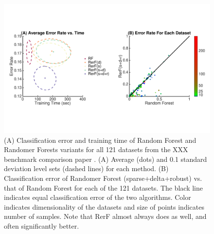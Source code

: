 \documentclass{article} %
\begin{document}
\begin{figure}[h]
\begin{center}
\includegraphics[trim=0in 2.3in 0in 2.3in, clip=true, width=\linewidth]{../Figures/pdf/Fig4}
\end{center}
\caption{(A) Classification error and training time of Random Forest and Randomer Forests variants for all 121 datasets from the XXX benchmark comparison paper \cite{???}. (A) Average (dots) and 0.1 standard deviation level sets (dashed lines) for each method. (B) Classification error of Randomer Forest (sparse+delta+robust) vs. that of Random Forest for each of the 121 datasets. The black line indicates equal classification error of the two algorithms. Color indicates dimensionality of the datasets and size of points indicates number of samples. Note that RerF almost always does as well, and often significantly better.}
\end{figure}

\appendix
\setcounter{figure}{0}
\renewcommand\thefigure{A\arabic{figure}}
\end{document}
